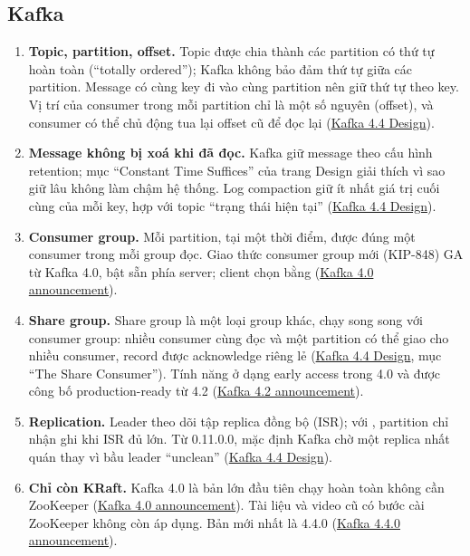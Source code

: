 \subsection{Kafka}
\begin{enumerate}
  \item \textbf{Topic, partition, offset.} Topic được chia thành các partition có thứ tự hoàn toàn (``totally ordered''); Kafka không bảo đảm thứ tự giữa các partition. Message có cùng key đi vào cùng partition nên giữ thứ tự theo key. Vị trí của consumer trong mỗi partition chỉ là một số nguyên (offset), và consumer có thể chủ động tua lại offset cũ để đọc lại (\href{https://kafka.apache.org/44/design/design/}{Kafka 4.4 Design}).
  \item \textbf{Message không bị xoá khi đã đọc.} Kafka giữ message theo cấu hình retention; mục ``Constant Time Suffices'' của trang Design giải thích vì sao giữ lâu không làm chậm hệ thống. Log compaction giữ ít nhất giá trị cuối cùng của mỗi key, hợp với topic ``trạng thái hiện tại'' (\href{https://kafka.apache.org/44/design/design/}{Kafka 4.4 Design}).
  \item \textbf{Consumer group.} Mỗi partition, tại một thời điểm, được đúng một consumer trong mỗi group đọc. Giao thức consumer group mới (KIP-848) GA từ Kafka 4.0, bật sẵn phía server; client chọn bằng  (\href{https://kafka.apache.org/blog/2025/03/18/apache-kafka-4.0.0-release-announcement/}{Kafka 4.0 announcement}).
  \item \textbf{Share group.} Share group là một loại group khác, chạy song song với consumer group: nhiều consumer cùng đọc và một partition có thể giao cho nhiều consumer, record được acknowledge riêng lẻ (\href{https://kafka.apache.org/44/design/design/}{Kafka 4.4 Design}, mục ``The Share Consumer''). Tính năng ở dạng early access trong 4.0 và được công bố production-ready từ 4.2 (\href{https://kafka.apache.org/blog/2026/02/17/apache-kafka-4.2.0-release-announcement/}{Kafka 4.2 announcement}).
  \item \textbf{Replication.} Leader theo dõi tập replica đồng bộ (ISR); với , partition chỉ nhận ghi khi ISR đủ lớn. Từ 0.11.0.0, mặc định Kafka chờ một replica nhất quán thay vì bầu leader ``unclean'' (\href{https://kafka.apache.org/44/design/design/}{Kafka 4.4 Design}).
  \item \textbf{Chỉ còn KRaft.} Kafka 4.0 là bản lớn đầu tiên chạy hoàn toàn không cần ZooKeeper (\href{https://kafka.apache.org/blog/2025/03/18/apache-kafka-4.0.0-release-announcement/}{Kafka 4.0 announcement}). Tài liệu và video cũ có bước cài ZooKeeper không còn áp dụng. Bản mới nhất là 4.4.0 (\href{https://kafka.apache.org/blog/2026/10/22/apache-kafka-4.4.0-release-announcement/}{Kafka 4.4.0 announcement}).

\end{enumerate}
